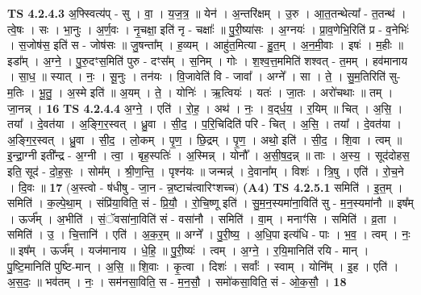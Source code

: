 \documentclass[17pt]{extarticle}
\begin{document}
                  \newline
                                \textbf{ TS 4.2.4.3} \newline
                  अ॒फ्स्वित्य॑प् - सु । वा॒ । य॒ज॒त्र॒ ॥ येन॑ । अ॒न्तरि॑क्षम् । उ॒रु । आ॒त॒तन्थेत्या᳚ - त॒तन्थ॑ । त्वे॒षः । सः । भा॒नुः । अ॒र्ण॒वः । नृ॒चक्षा॒ इति॑ नृ - चक्षाः᳚ ॥ पु॒री॒ष्या॑सः । अ॒ग्नयः॑ । प्रा॒व॒णेभि॒रिति॑ प्र - व॒नेभिः॑ । स॒जोष॑स॒ इति॑ स - जोष॑सः ॥ जु॒षन्ता᳚म् । ह॒व्यम् । आहु॑त॒मित्या - हु॒त॒म् । अ॒न॒मी॒वाः । इषः॑ । म॒हीः ॥ इडा᳚म् । अ॒ग्ने॒ । पु॒रु॒दꣳस॒मिति॑ पुरु - दꣳस᳚म् । स॒निम् । गोः । श॒श्व॒त्त॒ममिति॑ शश्वत् - त॒मम् । हव॑मानाय । सा॒ध॒ ॥ स्यात् । नः॒ । सू॒नुः । तन॑यः । वि॒जावेति॑ वि - जावा᳚ । अग्ने᳚ । सा । ते॒ । सु॒म॒तिरिति॑ सु-म॒तिः । भू॒तु॒ । अ॒स्मे इति॑ ॥ अ॒यम् । ते॒ । योनिः॑ । ऋ॒त्वियः॑ । यतः॑ । जा॒तः । अरो॑चथाः ॥ तम् । जा॒नन्न् । \textbf{  16} \newline
                  \newline
                                \textbf{ TS 4.2.4.4} \newline
                  अ॒ग्ने॒ । एति॑ । रो॒ह॒ । अथ॑ । नः॒ । व॒द्‌र्ध॒य॒ । र॒यिम् ॥ चित् । अ॒सि॒ । तया᳚ । दे॒वत॑या । अ॒ङ्गि॒र॒स्वत् । ध्रु॒वा । सी॒द॒ । प॒रि॒चिदिति॑ परि - चित् । अ॒सि॒ । तया᳚ । दे॒वत॑या । अ॒ङ्गि॒र॒स्वत् । ध्रु॒वा । सी॒द॒ । लो॒कम् । पृ॒ण॒ । छि॒द्रम् । पृ॒ण॒ । अथो॒ इति॑ । सी॒द॒ । शि॒वा । त्वम् ॥ इ॒न्द्रा॒ग्नी इती᳚न्द्र - अ॒ग्नी । त्वा॒ । बृह॒स्पतिः॑ । अ॒स्मिन्न् । योनौ᳚ । अ॒सी॒ष॒द॒न्न् ॥ ताः । अ॒स्य॒ । सूद॑दोहस॒ इति॒ सूद॑ - दो॒ह॒सः॒ । सोम᳚म् । श्री॒ण॒न्ति॒ । पृश्न॑यः ॥ जन्मन्न्॑ । दे॒वाना᳚म् । विशः॑ । त्रि॒षु । एति॑ । रो॒च॒ने । दि॒वः ॥ \textbf{  17} \newline
                  \newline
                      (अ॒स्त्वो - ष॑धीषु - जा॒न - न्न॒ष्टाच॑त्वारिꣳशच्च)  \textbf{(A4)} \newline \newline
                                \textbf{ TS 4.2.5.1} \newline
                  समिति॑ । इ॒त॒म् । समिति॑ । क॒ल्पे॒था॒म् । संप्रि॑या॒विति॒ सं - प्रि॒यौ॒ । रो॒चि॒ष्णू इति॑ । सु॒म॒न॒स्यमा॑ना॒विति॑ सु - म॒न॒स्यमा॑नौ ॥ इष᳚म् । ऊर्ज᳚म् । अ॒भीति॑ । सं॒ॅवसा॑ना॒विति॑ सं - वसा॑नौ । समिति॑ । वा॒म् । मनाꣳ॑सि । समिति॑ । व्र॒ता । समिति॑ । उ॒ । चि॒त्तानि॑ । एति॑ । अ॒क॒र॒म् ॥ अग्ने᳚ । पु॒री॒ष्य॒ । अ॒धि॒पा इत्य॑धि - पाः । भ॒व॒ । त्वम् । नः॒ ॥ इष᳚म् । ऊर्ज᳚म् । यज॑मानाय । धे॒हि॒ ॥ पु॒री॒ष्यः॑ । त्वम् । अ॒ग्ने॒ । र॒यि॒मानिति॑ रयि - मान् । पु॒ष्टि॒मानिति॑ पुष्टि-मान् । अ॒सि॒ ॥ शि॒वाः । कृ॒त्वा । दिशः॑ । सर्वाः᳚ । स्वाम् । योनि᳚म् । इ॒ह । एति॑ । अ॒स॒दः॒ ॥ भव॑तम् । नः॒ । सम॑नसा॒विति॒ स - म॒न॒सौ॒ । समो॑कसा॒विति॒ सं - ओ॒क॒सौ॒ । \textbf{  18} \newline
\end{document}
